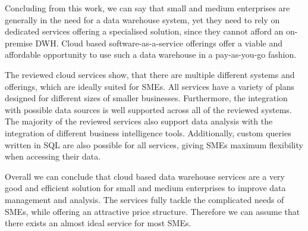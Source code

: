 \documentclass[../paper.tex]{subfiles}
\begin{document}
Concluding from this work, we can say that small and medium enterprises
are generally in the need for a data warehouse system, yet they need to
rely on dedicated services offering a specialised solution, since they
cannot afford an on-premise DWH. Cloud based software-as-a-service offerings
offer a viable and affordable opportunity to use such a data warehouse in a
pay-as-you-go fashion.

The reviewed cloud services show, that there are multiple different systems and
offerings, which are ideally suited for SMEs. All services have a variety
of plans designed for different sizes of smaller businesses. Furthermore,
the integration with possible data sources is well supported across all
of the reviewed systems. The majority of the reviewed services also support 
data analysis with the integration of different business intelligence tools.
Additionally, custom queries written in SQL are also possible for all services,
giving SMEs maximum flexibility when accessing their data.

Overall we can conclude that cloud based data warehouse services are a very
good and efficient solution for small and medium enterprises to improve data
management and analysis. The services fully tackle the complicated needs of
SMEs, while offering an attractive price structure. Therefore we can
assume that there exists an almost ideal service for most SMEs.
\end{document}
